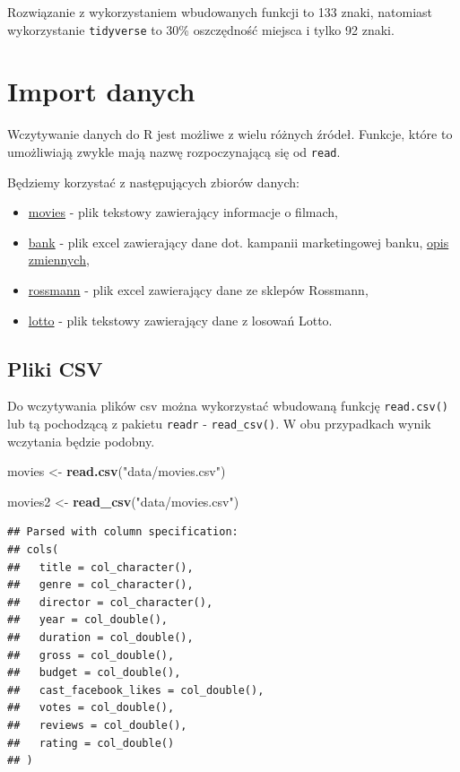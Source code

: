 \documentclass[]{book}
\newenvironment{Shaded}{\begin{snugshade}}{\end{snugshade}}
\newcommand{\KeywordTok}[1]{\textcolor[rgb]{0.13,0.29,0.53}{\textbf{#1}}}
\newcommand{\StringTok}[1]{\textcolor[rgb]{0.31,0.60,0.02}{#1}}
\newcommand{\NormalTok}[1]{#1}
\providecommand{\tightlist}{%
  \setlength{\itemsep}{0pt}\setlength{\parskip}{0pt}}
\begin{document}
Rozwiązanie z wykorzystaniem wbudowanych funkcji to 133 znaki, natomiast
wykorzystanie \texttt{tidyverse} to 30\% oszczędność miejsca i tylko 92
znaki.

\section{Import danych}\label{import-danych}

Wczytywanie danych do R jest możliwe z wielu różnych źródeł. Funkcje,
które to umożliwiają zwykle mają nazwę rozpoczynającą się od
\texttt{read}.

Będziemy korzystać z następujących zbiorów danych:

\begin{itemize}
\tightlist
\item
  \href{data/movies.csv}{movies} - plik tekstowy zawierający informacje
  o filmach,
\item
  \href{data/bank.xlsx}{bank} - plik excel zawierający dane dot.
  kampanii marketingowej banku, \href{data/bank_opis.pdf}{opis
  zmiennych},
\item
  \href{data/rossmann.xlsx}{rossmann} - plik excel zawierający dane ze
  sklepów Rossmann,
\item
  \href{http://www.mbnet.com.pl/dl.txt}{lotto} - plik tekstowy
  zawierający dane z losowań Lotto.
\end{itemize}

\subsection{Pliki CSV}\label{pliki-csv}

Do wczytywania plików csv można wykorzystać wbudowaną funkcję
\texttt{read.csv()} lub tą pochodzącą z pakietu \texttt{readr} -
\texttt{read\_csv()}. W obu przypadkach wynik wczytania będzie podobny.

\begin{Shaded}
\begin{Highlighting}[]
\NormalTok{movies <-}\StringTok{ }\KeywordTok{read.csv}\NormalTok{(}\StringTok{"data/movies.csv"}\NormalTok{)}

\NormalTok{movies2 <-}\StringTok{ }\KeywordTok{read_csv}\NormalTok{(}\StringTok{"data/movies.csv"}\NormalTok{)}
\end{Highlighting}
\end{Shaded}

\begin{verbatim}
## Parsed with column specification:
## cols(
##   title = col_character(),
##   genre = col_character(),
##   director = col_character(),
##   year = col_double(),
##   duration = col_double(),
##   gross = col_double(),
##   budget = col_double(),
##   cast_facebook_likes = col_double(),
##   votes = col_double(),
##   reviews = col_double(),
##   rating = col_double()
## )
\end{verbatim}
\end{document}
